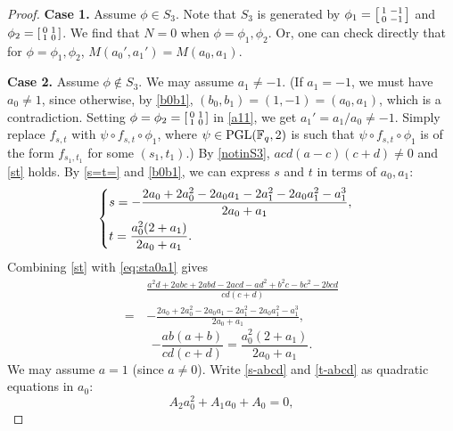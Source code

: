 \documentclass{amsart}
\numberwithin{equation}{section}
\theoremstyle{definition}
\newcommand{\f}{\Bbb F}
\newcommand{\pgl}{\mathrm{PGL}}
\begin{document}
\begin{proof}
\medskip
{\bf Case 1.} Assume $\phi\in S_3$. Note that $S_3$ is generated by $\phi_1=\left[\begin{smallmatrix}1&-1\cr 0&-1\end{smallmatrix}\right]$ and $\phi_2=\left[\begin{smallmatrix}0&1\cr 1&0\end{smallmatrix}\right]$. We find that $N=0$ when $\phi=\phi_1, \phi_2$. Or, one can check directly that for $\phi=\phi_1,\phi_2$, $M(a_0',a_1')=M(a_0,a_1)$.

\medskip
{\bf Case 2.} Assume $\phi\notin S_3$.  We may assume $a_1\ne -1$. (If $a_1=-1$, we must have $a_0\ne 1$, since otherwise, by \eqref{b0b1}, $(b_0,b_1)=(1,-1)=(a_0,a_1)$, which is a contradiction. Setting $\phi=\phi_2=\left[\begin{smallmatrix}0&1\cr 1&0\end{smallmatrix}\right]$ in \eqref{a11}, we get $a_1'=a_1/a_0\ne-1$. Simply replace $f_{s,t}$ with $\psi\circ f_{s,t}\circ\phi_1$, where $\psi\in\pgl(\f_q,2)$ is such that $\psi\circ f_{s,t}\circ\phi_1$ is of the form $f_{s_1,t_1}$ for some $(s_1,t_1)$.) By \eqref{notinS3}, $acd(a-c)(c+d)\ne 0$ and \eqref{st} holds. By \eqref{s=t=} and \eqref{b0b1}, we can express $s$ and $t$ in terms of $a_0, a_1$:
\begin{equation}\label{eq:sta0a1}
\begin{cases}
s=\displaystyle-\frac{2 a_0+2 a_0^2-2 a_0 a_1-2 a_1^2-2 a_0 a_1^2-a_1^3}{2 a_0+a_1},\vspace{0.4em}\cr
t=\displaystyle\frac{a_0^2 (2 + a_1)}{2 a_0 + a_1}.
\end{cases}
\end{equation}
Combining \eqref{st} with \eqref{eq:sta0a1} gives
\begin{align}\label{s-abcd}
&\frac{a^2 d+2 a b c+2 a b d-2 a c d-a d^2+b^2 c-b c^2-2 b c d}{c d (c+d)}\\
=\,&-\frac{2 a_0+2 a_0^2-2 a_0 a_1-2 a_1^2-2 a_0 a_1^2-a_1^3}{2 a_0+a_1},\nonumber
\end{align}
\begin{equation}\label{t-abcd}
-\frac{a b (a+b)}{c d (c+d)}=\frac{a_0^2 (2 + a_1)}{2 a_0 + a_1}.
\end{equation}
We may assume $a=1$ (since $a\ne 0$). Write \eqref{s-abcd} and \eqref{t-abcd} as quadratic equations in $a_0$:
\begin{equation}\label{E1}
A_2a_0^2+A_1a_0+A_0=0,
\end{equation}
\begin{equation}\label{E2}

\end{equation}
\end{proof}
\end{document}
